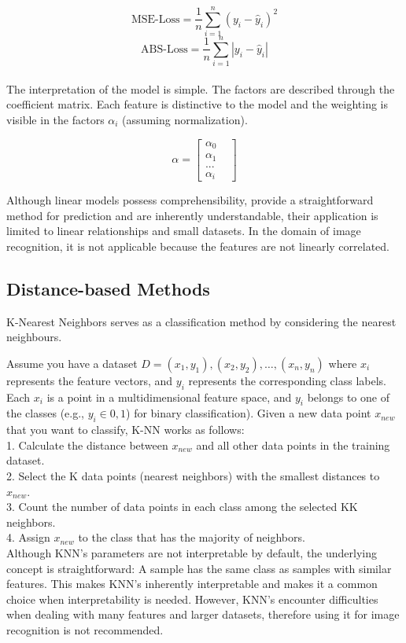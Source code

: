 $$ \text{MSE-Loss} = \frac{1}{n} \sum_{i=1}^{n} (y_i - \hat{y}_i)^2$$
$$ \text{ABS-Loss} = \frac{1}{n} \sum_{i=1}^{n} |y_i - \hat{y}_i|$$
\\
The interpretation of the model is simple. The factors are described through the coefficient matrix. Each feature is distinctive to the model and the weighting is visible in the factors $\alpha_{i}$ (assuming normalization).

$$ \alpha = \begin{bmatrix}
	\alpha_0 & \\
	\alpha_1 & \\
	... & \\
	\alpha_i &
\end{bmatrix}
$$

Although linear models possess comprehensibility, provide a straightforward method for prediction and are inherently understandable, their application is limited to linear relationships and small datasets. In the domain of image recognition, it is not applicable because the features are not linearly correlated.

\subsection{Distance-based Methods}

K-Nearest Neighbors serves as a classification method by considering the nearest neighbours. 


Assume you have a dataset $D={(x_1,y_1),(x_2,y_2),…,(x_n,y_n)}$ where $x_i$ represents the feature vectors, and $y_i$ represents the corresponding class labels. Each $x_i$ is a point in a multidimensional feature space, and $y_i$ belongs to one of the classes (e.g., $y_i \in 0,1$) for binary classification). 
Given a new data point $x_{new}$ that you want to classify, K-NN works as follows:\\

1. Calculate the distance between $x_{new}$ and all other data points in the training dataset.\\
2. Select the K data points (nearest neighbors) with the smallest distances to $x_{new}$.\\
3. Count the number of data points in each class among the selected KK neighbors.\\
4. Assign $x_{new}$ to the class that has the majority of neighbors.\\

Although KNN's parameters are not interpretable by default, the underlying concept is straightforward: A sample has the same class as samples with similar features. This makes KNN's inherently interpretable and makes it a common choice when interpretability is needed. However, KNN's encounter difficulties when dealing with many features and larger datasets, therefore using it for image recognition is not recommended.

